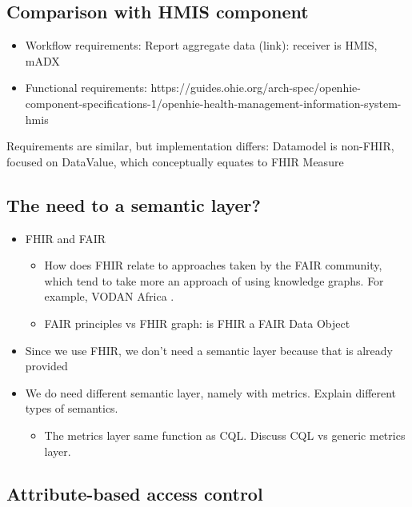 \documentclass[
  authoryear]{elsarticle}
\providecommand{\tightlist}{%
  \setlength{\itemsep}{0pt}\setlength{\parskip}{0pt}}\usepackage{longtable,booktabs,array}
\begin{document}
\subsection{Comparison with HMIS
component}\label{comparison-with-hmis-component}

\begin{itemize}
\tightlist
\item
  Workflow requirements: Report aggregate data (link): receiver is HMIS,
  mADX
\item
  Functional requirements:
  https://guides.ohie.org/arch-spec/openhie-component-specifications-1/openhie-health-management-information-system-hmis
\end{itemize}

Requirements are similar, but implementation differs: Datamodel is
non-FHIR, focused on DataValue, which conceptually equates to FHIR
Measure

\subsection{The need to a semantic
layer?}\label{the-need-to-a-semantic-layer}

\begin{itemize}
\tightlist
\item
  FHIR and FAIR

  \begin{itemize}
  \tightlist
  \item
    How does FHIR relate to approaches taken by the FAIR community,
    which tend to take more an approach of using knowledge graphs. For
    example, VODAN Africa
    \citep{gebreslassie2023fhir4fair, purnamajati2022data}.
  \item
    FAIR principles vs FHIR graph: is FHIR a FAIR Data Object
  \end{itemize}
\item
  Since we use FHIR, we don't need a semantic layer because that is
  already provided
\item
  We do need different semantic layer, namely with metrics. Explain
  different types of semantics.

  \begin{itemize}
  \tightlist
  \item
    The metrics layer same function as CQL. Discuss CQL vs generic
    metrics layer.
  \end{itemize}
\end{itemize}

\subsection{Attribute-based access
control}\label{attribute-based-access-control}
\end{document}
